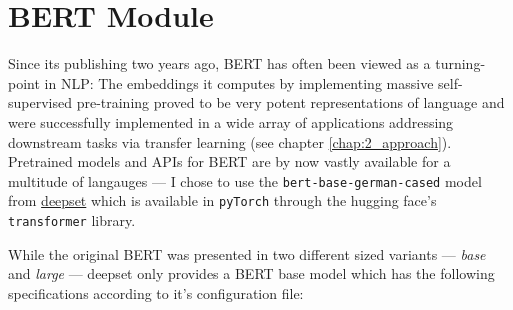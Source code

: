 \section{BERT Module}

Since its publishing two years ago, BERT \citep{devlin2018bert} has
often been viewed as a turning-point in NLP: The embeddings it computes
by implementing massive self-supervised pre-training proved to be very
potent representations of language and were successfully implemented in
a wide array of applications addressing downstream tasks via transfer
learning (see chapter \ref{chap:2_approach}). Pretrained models and
APIs for BERT are by now vastly available for a multitude of langauges
--- I chose to use the \texttt{bert-base-german-cased} model from
\href{https://deepset.ai/german-bert}{deepset} which is available
in \texttt{pyTorch} through the hugging face's \texttt{transformer}
library\cite{wolf2019transformers}.

While the original BERT was presented in two different sized variants --- \emph{base}
and \emph{large} --- deepset only provides a BERT base model which has the following
specifications according to it's configuration file:


